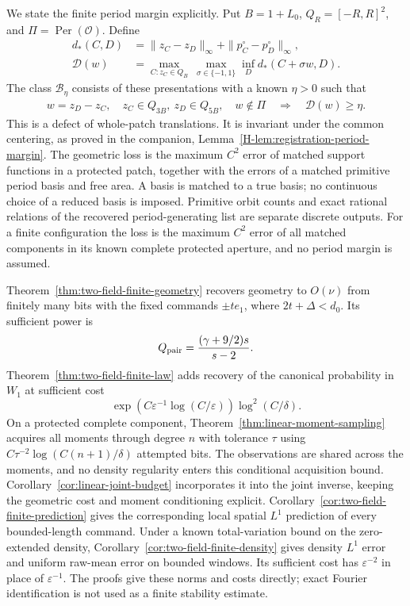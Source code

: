 We state the finite period margin explicitly. Put $B=1+L_0$,
$Q_R=[-R,R]^2$, and $\Pi=\operatorname{Per}(\mathcal O)$. Define
\begin{align}
 d_*(C,D)&=\|z_C-z_D\|_\infty+
                         \|p_C^\circ-p_D^\circ\|_\infty,\nonumber\\
 \mathcal D(w)&=\max_{C:z_C\in Q_B}\ \max_{\sigma\in\{-1,1\}}
                            \inf_D d_*(C+\sigma w,D).
                   \label{eq:two-field-patch-defect}
\end{align}
The class $\mathcal B_\eta$ consists of these presentations with a
known $\eta>0$ such that
\begin{equation}\label{eq:two-field-patch-margin}
 \begin{gathered}
 w=z_D-z_C,\quad z_C\in Q_{3B},\ z_D\in Q_{5B},\quad w\notin\Pi
                 \quad\Longrightarrow\quad\mathcal D(w)\ge\eta.
 \end{gathered}
\end{equation}
This is a defect of whole-patch translations. It is invariant under
the common centering, as proved in the companion,
Lemma~\ref{H-lem:registration-period-margin}. The geometric loss is
the maximum $C^2$ error of matched support functions in a protected
patch, together with the errors of a matched primitive period basis
and free area. A basis is matched to a true basis; no continuous
choice of a reduced basis is imposed. Primitive orbit counts and
exact rational relations of the recovered period-generating list are
separate discrete outputs. For a finite configuration the loss is
the maximum $C^2$ error of all matched components in its known
complete protected aperture, and no period margin is assumed.

Theorem~\ref{thm:two-field-finite-geometry} recovers geometry to
$O(\nu)$ from finitely many bits with the fixed commands $\pm te_1$,
where $2t+\Delta<d_0$. Its sufficient power is
\[
            Q_{\rm pair}=\frac{(\gamma+9/2)s}{s-2}.
\]
Theorem~\ref{thm:two-field-finite-law} adds recovery of the canonical
probability in $W_1$ at sufficient cost
\[
 \exp(C\varepsilon^{-1}\log(C/\varepsilon))\log^2(C/\delta).
\]
On a protected complete component, Theorem~\ref{thm:linear-moment-sampling}
acquires all moments through degree $n$ with tolerance $\tau$ using
$C\tau^{-2}\log(C(n+1)/\delta)$ attempted bits. The observations are
shared across the moments, and no density regularity enters this
conditional acquisition bound. Corollary~\ref{cor:linear-joint-budget}
incorporates it into the joint inverse, keeping the geometric cost
and moment conditioning explicit.
Corollary~\ref{cor:two-field-finite-prediction} gives the corresponding
local spatial $L^1$ prediction of every bounded-length command.
Under a known total-variation bound on the zero-extended density,
Corollary~\ref{cor:two-field-finite-density} gives density $L^1$ error
and uniform raw-mean error on bounded windows. Its sufficient cost
has $\varepsilon^{-2}$ in place of $\varepsilon^{-1}$. The proofs
give these norms and costs directly; exact Fourier identification is
not used as a finite stability estimate.

